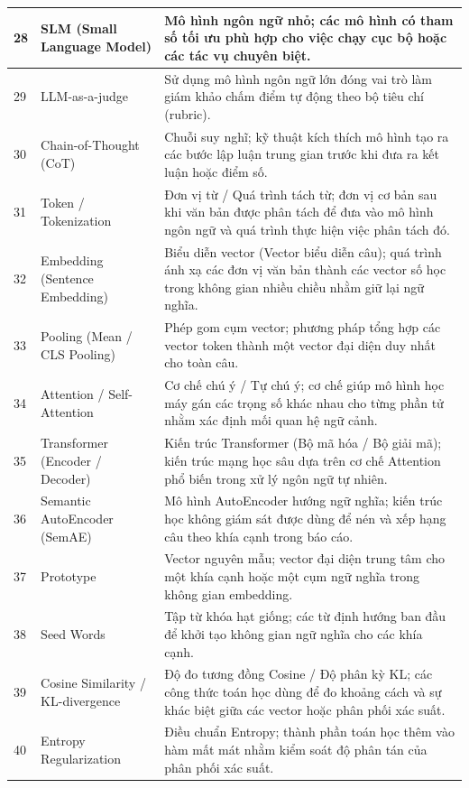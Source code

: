 \documentclass[12pt,a4paper]{report}
\begin{document}
\begin{longtable}{|p{}|p{}|p{}|}
28 & SLM (Small Language Model) & Mô hình ngôn ngữ nhỏ; các mô hình có tham số tối ưu phù hợp cho việc chạy cục bộ hoặc các tác vụ chuyên biệt. \\ \hline
29 & LLM-as-a-judge & Sử dụng mô hình ngôn ngữ lớn đóng vai trò làm giám khảo chấm điểm tự động theo bộ tiêu chí (rubric). \\ \hline
30 & Chain-of-Thought (CoT) & Chuỗi suy nghĩ; kỹ thuật kích thích mô hình tạo ra các bước lập luận trung gian trước khi đưa ra kết luận hoặc điểm số. \\ \hline
31 & Token / Tokenization & Đơn vị từ / Quá trình tách từ; đơn vị cơ bản sau khi văn bản được phân tách để đưa vào mô hình ngôn ngữ và quá trình thực hiện việc phân tách đó. \\ \hline
32 & Embedding (Sentence Embedding) & Biểu diễn vector (Vector biểu diễn câu); quá trình ánh xạ các đơn vị văn bản thành các vector số học trong không gian nhiều chiều nhằm giữ lại ngữ nghĩa. \\ \hline
33 & Pooling (Mean / CLS Pooling) & Phép gom cụm vector; phương pháp tổng hợp các vector token thành một vector đại diện duy nhất cho toàn câu. \\ \hline
34 & Attention / Self-Attention & Cơ chế chú ý / Tự chú ý; cơ chế giúp mô hình học máy gán các trọng số khác nhau cho từng phần tử nhằm xác định mối quan hệ ngữ cảnh. \\ \hline
35 & Transformer (Encoder / Decoder) & Kiến trúc Transformer (Bộ mã hóa / Bộ giải mã); kiến trúc mạng học sâu dựa trên cơ chế Attention phổ biến trong xử lý ngôn ngữ tự nhiên. \\ \hline
36 & Semantic AutoEncoder (SemAE) & Mô hình AutoEncoder hướng ngữ nghĩa; kiến trúc học không giám sát được dùng để nén và xếp hạng câu theo khía cạnh trong báo cáo. \\ \hline
37 & Prototype & Vector nguyên mẫu; vector đại diện trung tâm cho một khía cạnh hoặc một cụm ngữ nghĩa trong không gian embedding. \\ \hline
38 & Seed Words & Tập từ khóa hạt giống; các từ định hướng ban đầu để khởi tạo không gian ngữ nghĩa cho các khía cạnh. \\ \hline
39 & Cosine Similarity / KL-divergence & Độ đo tương đồng Cosine / Độ phân kỳ KL; các công thức toán học dùng để đo khoảng cách và sự khác biệt giữa các vector hoặc phân phối xác suất. \\ \hline
40 & Entropy Regularization & Điều chuẩn Entropy; thành phần toán học thêm vào hàm mất mát nhằm kiểm soát độ phân tán của phân phối xác suất. \\ \hline

\end{longtable}
\end{document}
